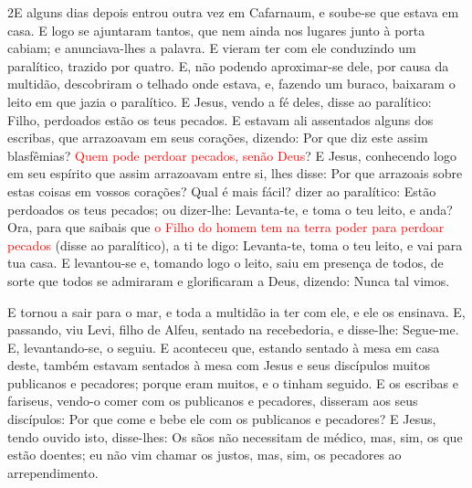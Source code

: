 \lettrine{2} E alguns dias depois entrou outra vez em
Cafarnaum, e soube-se que estava em casa. E logo se ajuntaram
tantos, que nem ainda nos lugares junto à porta cabiam; e
anunciava-lhes a palavra. E vieram ter com ele conduzindo um
paralítico, trazido por quatro. E, não podendo aproximar-se
dele, por causa da multidão, descobriram o telhado onde estava, e,
fazendo um buraco, baixaram o leito em que jazia o paralítico. E
Jesus, vendo a fé deles, disse ao paralítico: Filho, perdoados estão
os teus pecados. E estavam ali assentados alguns dos escribas,
que arrazoavam em seus corações, dizendo: Por que diz este assim
blasfêmias? \textcolor{red}{Quem pode perdoar pecados, senão Deus}? E
Jesus, conhecendo logo em seu espírito que assim arrazoavam entre
si, lhes disse: Por que arrazoais sobre estas coisas em vossos
corações? Qual é mais fácil? dizer ao paralítico: Estão
perdoados os teus pecados; ou dizer-lhe: Levanta-te, e toma o teu
leito, e anda? Ora, para que saibais que \textcolor{red}{o Filho do
homem tem na terra poder para perdoar pecados} (disse ao
paralítico), a ti te digo: Levanta-te, toma o teu leito, e
vai para tua casa. E levantou-se e, tomando logo o leito,
saiu em presença de todos, de sorte que todos se admiraram e
glorificaram a Deus, dizendo: Nunca tal vimos.

E tornou a sair para o mar, e toda a multidão ia ter com ele, e
ele os ensinava. E, passando, viu Levi, filho de Alfeu,
sentado na recebedoria, e disse-lhe: Segue-me. E, levantando-se, o
seguiu. E aconteceu que, estando sentado à mesa em casa
deste, também estavam sentados à mesa com Jesus e seus discípulos
muitos publicanos e pecadores; porque eram muitos, e o tinham
seguido. E os escribas e fariseus, vendo-o comer com os
publicanos e pecadores, disseram aos seus discípulos: Por que come e
bebe ele com os publicanos e pecadores? E Jesus, tendo ouvido
isto, disse-lhes: Os sãos não necessitam de médico, mas, sim, os que
estão doentes; eu não vim chamar os justos, mas, sim, os pecadores
ao arrependimento.

